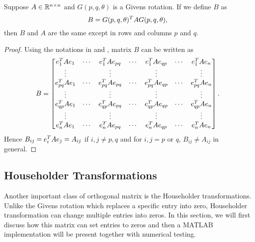 \begin{proposition}\label{prop:1.3}
  Suppose $A\in \mathbb{R}^{n\times n}$ and $G(p,q,\theta)$ is a Givens rotation. If we define $B$ as $$B = G(p,q,\theta)^T AG(p,q,\theta),$$ 
  then $B$ and $A$ are the same except in rows and columns $p$ and $q$.
\end{proposition}

\begin{proof} 
  Using the notations in  and , matrix $B$ can be written as
  \begin{equation}\notag
      \begin{aligned}
          B =
          \begin{bmatrix}
              e_{1}^T A e_{1} & \cdots & e_{1}^T A e_{p q} & \cdots & e_{1}^T A e_{q p}  &\cdots & e_{1}^T A e_{n} \\
              \vdots &  & \vdots &  & \vdots  &  & \vdots \\
              e_{pq}^T A e_{1} & \cdots & e_{pq}^T A e_{p q} & \cdots & e_{pq}^T A e_{q p}  &\cdots & e_{pq}^T A e_{n} \\
              \vdots &  & \vdots &  & \vdots  &  & \vdots \\
              e_{qp}^T A e_{1} & \cdots & e_{qp}^T A e_{p q} & \cdots & e_{qp}^T A e_{q p}  &\cdots & e_{qp}^T A e_{n} \\
              \vdots &  & \vdots &  & \vdots  &  & \vdots \\
              e_{n}^T A e_{1} & \cdots & e_{n}^T A e_{p q} & \cdots & e_{n}^T A e_{q p}  &\cdots & e_{n}^T A e_{n} \\
          \end{bmatrix}.
      \end{aligned}
  \end{equation}
  Hence $B_{ij} = e_i^T Ae_j = A_{ij}$ if $i,j \neq p,q$ and for $i,j = p$ or $q$, $B_{ij}\neq A_{ij}$ in general.
\end{proof}

\subsection{Householder Transformations}\label{sec:Householder}

Another important class of orthogonal matrix is the Householder transformations. Unlike the Givens rotation which replaces a specific entry into zero, Householder transformation can change multiple entries into zeros. In this section, we will first discuss how this matrix can set entries to zeros and then a MATLAB implementation will be present together with numerical testing.

